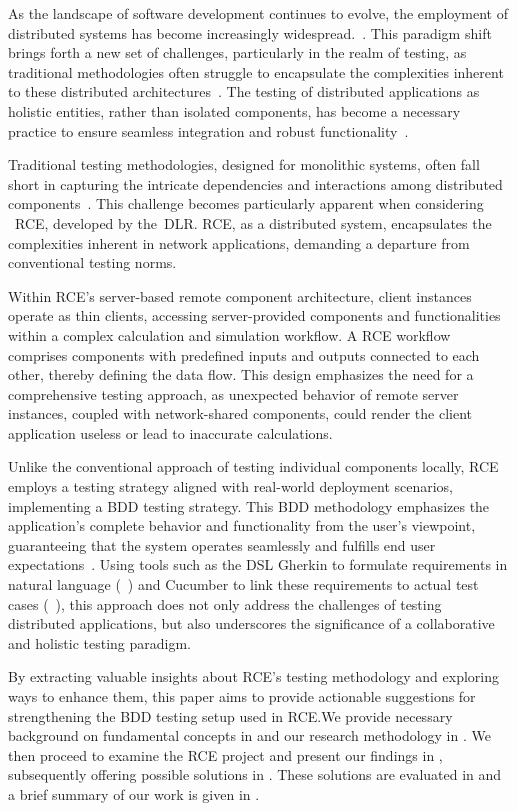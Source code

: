 As the landscape of software development continues to evolve, the employment of distributed systems has become increasingly widespread.~\cite{Xingang2018,Feldman1978}. This paradigm shift brings forth a new set of challenges, particularly in the realm of testing, as traditional methodologies often struggle to encapsulate the complexities inherent to these distributed architectures~\cite{Liu,Lima2017}. The testing of distributed applications as holistic entities, rather than isolated components, has become a necessary practice to ensure seamless integration and robust functionality~\cite{Liu,Lima2017}.

Traditional testing methodologies, designed for monolithic systems, often fall short in capturing the intricate dependencies and interactions among distributed components~\cite{Liu,Lima2017}. This challenge becomes particularly apparent when considering ~\acf{RCE}, developed by the~\acf{DLR}. \ac{RCE}, as a distributed system, encapsulates the complexities inherent in network applications, demanding a departure from conventional testing norms.

Within \ac{RCE}'s server-based remote component architecture, client instances operate as thin clients, accessing server-provided components and functionalities within a complex calculation and simulation workflow. A \ac{RCE} workflow comprises components with predefined inputs and outputs connected to each other, thereby defining the data flow. This design emphasizes the need for a comprehensive testing approach, as unexpected behavior of remote server instances, coupled with network-shared components, could render the client application useless or lead to inaccurate calculations.

Unlike the conventional approach of testing individual components locally, \ac{RCE} employs a testing strategy aligned with real-world deployment scenarios, implementing a \ac{BDD} testing strategy. This \ac{BDD} methodology emphasizes the application's complete behavior and functionality from the user's viewpoint, guaranteeing that the system operates seamlessly and fulfills end user expectations~\cite{wynne2012cucumber}. Using tools such as the \ac{DSL} Gherkin to formulate requirements in natural language (~) and Cucumber to link these requirements to actual test cases (~), this approach does not only address the challenges of testing distributed applications, but also underscores the significance of a collaborative and holistic testing paradigm.

By extracting valuable insights about \ac{RCE}'s testing methodology and exploring ways to enhance them, this paper aims to provide actionable suggestions for strengthening the \ac{BDD} testing setup used in \ac{RCE}.We provide necessary background on fundamental concepts in  and our research methodology in . We then proceed to examine the \ac{RCE} project and present our findings in , subsequently offering possible solutions in . These solutions are evaluated in  and a brief summary of our work is given in .